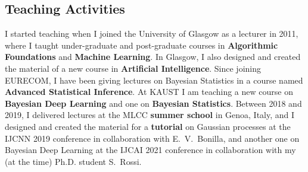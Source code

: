 \documentclass[oneside, a4paper, onecolumn, 10pt]{article}
\begin{document}



\subsection*{Teaching Activities}

I started teaching when I joined the University of Glasgow as a lecturer in 2011, where I taught under-graduate and post-graduate courses in {\bf Algorithmic Foundations} and {\bf Machine Learning}.
In Glasgow, I also designed and created the material of a new course in {\bf Artificial Intelligence}. 
Since joining EURECOM, I have been giving lectures on Bayesian Statistics in a course named {\bf Advanced Statistical Inference}.
At KAUST I am teaching a new course on {\bf Bayesian Deep Learning} and one on {\bf Bayesian Statistics}.
Between 2018 and 2019, I delivered lectures at the MLCC {\bf summer school} in Genoa, Italy, and I designed and created the material for a {\bf tutorial} on Gaussian processes at the IJCNN 2019 conference in collaboration with E.~V.~Bonilla, and another one on Bayesian Deep Learning at the IJCAI 2021 conference in collaboration with my (at the time) Ph.D. student S.~Rossi. 

\end{document}
